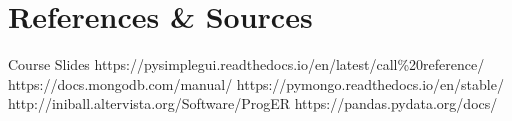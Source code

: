 \documentclass[a4paper,12pt]{article}
\begin{document}
\newpage
\section{References \& Sources}
  \begin{thebibliography}{9}
    \bibitem{} Course Slides
    \bibitem{} https://pysimplegui.readthedocs.io/en/latest/call\%20reference/
    \bibitem{} https://docs.mongodb.com/manual/
    \bibitem{} https://pymongo.readthedocs.io/en/stable/
    \bibitem{} http://iniball.altervista.org/Software/ProgER
    \bibitem{} https://pandas.pydata.org/docs/
  \end{thebibliography}
\end{document}
